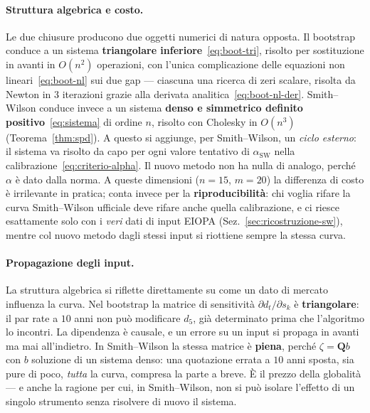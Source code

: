 \documentclass[11pt,a4paper]{article}
\theoremstyle{plain}
\theoremstyle{definition}
\theoremstyle{remark}
\newcommand{\Qmat}{\mathbf{Q}}
\newcommand{\alphaSW}{\alpha_{\mathrm{SW}}}
\begin{document}
\paragraph{Struttura algebrica e costo.}
Le due chiusure producono due oggetti numerici di natura opposta. Il bootstrap conduce a un
sistema \textbf{triangolare inferiore}~\eqref{eq:boot-tri}, risolto per sostituzione in avanti
in $O(n^2)$ operazioni, con l'unica complicazione delle equazioni non
lineari~\eqref{eq:boot-nl} sui due gap --- ciascuna una ricerca di zeri scalare, risolta da
Newton in $3$ iterazioni grazie alla derivata analitica~\eqref{eq:boot-nl-der}.
Smith--Wilson conduce invece a un sistema \textbf{denso e simmetrico definito
positivo}~\eqref{eq:sistema} di ordine $n$, risolto con Cholesky in $O(n^3)$
(Teorema~\ref{thm:spd}). A questo si aggiunge, per Smith--Wilson, un \emph{ciclo esterno}: il
sistema va risolto da capo per ogni valore tentativo di $\alphaSW$ nella
calibrazione~\eqref{eq:criterio-alpha}. Il nuovo metodo non ha nulla di analogo, perch\'e
$\alpha$ \`e dato dalla norma. A queste dimensioni ($n=15$, $m=20$) la differenza di costo \`e
irrilevante in pratica; conta invece per la \textbf{riproducibilit\`a}: chi voglia rifare la
curva Smith--Wilson ufficiale deve rifare anche quella calibrazione, e ci riesce esattamente
solo con i \emph{veri} dati di input EIOPA (Sez.~\ref{sec:ricostruzione-sw}), mentre col
nuovo metodo dagli stessi input si riottiene sempre la stessa curva.

\paragraph{Propagazione degli input.}
La struttura algebrica si riflette direttamente su come un dato di mercato influenza la curva.
Nel bootstrap la matrice di sensitivit\`a $\partial d_t/\partial s_k$ \`e
\textbf{triangolare}: il par rate a $10$ anni non pu\`o modificare $d_5$, gi\`a determinato
prima che l'algoritmo lo incontri. La dipendenza \`e causale, e un errore su un input si
propaga in avanti ma mai all'indietro. In Smith--Wilson la stessa matrice \`e \textbf{piena},
perch\'e $\zeta = \Qmat b$ con $b$ soluzione di un sistema denso: una quotazione errata a $10$
anni sposta, sia pure di poco, \emph{tutta} la curva, compresa la parte a breve. \`E il prezzo
della globalit\`a --- e anche la ragione per cui, in Smith--Wilson, non si pu\`o isolare
l'effetto di un singolo strumento senza risolvere di nuovo il sistema.


\end{document}
